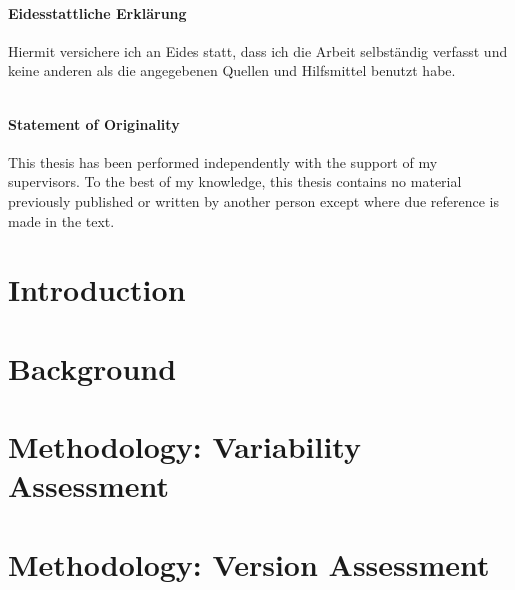 \documentclass[
	12pt,
	a4paper,
	oneside,
	openright,
	listof=totoc%
]{scrbook}
\begin{document}

\newpage
\thispagestyle{empty}


 $$\qquad$$
 $$\qquad$$
 $$\qquad$$
  $$\qquad$$
 $$\qquad$$
 $$\qquad$$
 
\subsubsection*{Eidesstattliche Erklärung}
 Hiermit versichere ich an Eides statt, dass ich die Arbeit selbständig verfasst
 und keine anderen als die angegebenen Quellen und Hilfsmittel benutzt habe.

\vspace{1.3cm}

 $$\qquad$$
 $$\qquad$$
 $$\qquad$$
\subsubsection*{Statement of Originality}
This thesis has been performed independently with the support of my
supervisors. To the best of my knowledge, this thesis contains no material previously published or written
by another person except where due reference is made in the text.

\vspace{1.3cm}


\clearpage
\setcounter{page}{1}
\tableofcontents
\listoffigures
\listoftables
{}
\chapter{Introduction}\label{chapter:1}
\setcounter{page}{1}


\chapter{Background}\label{chapter:2}


\chapter{Methodology: Variability Assessment}


\chapter{Methodology: Version Assessment}

\end{document}
